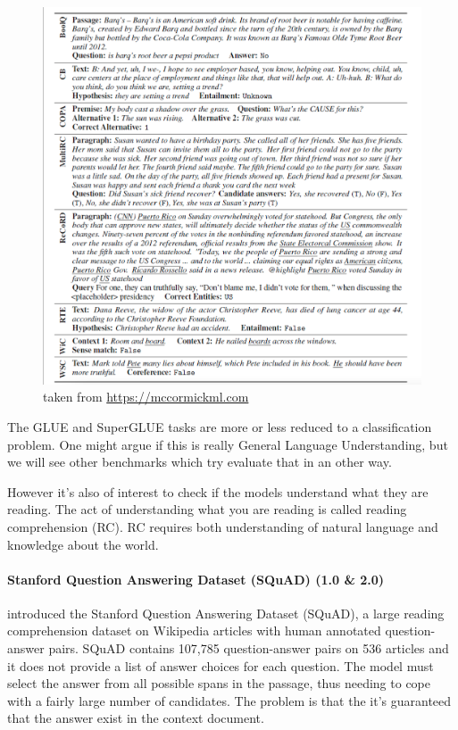 \documentclass[
]{krantz}
\begin{document}
\begin{figure}
\centering
\includegraphics{figures/01-chapter1/SuperGLUE.png}
\caption{taken from \url{https://mccormickml.com}}
\end{figure}

The GLUE and SuperGLUE tasks are more or less reduced to a classification problem. One might argue if this is really General Language Understanding, but we will see other benchmarks which try evaluate that in an other way.

However it's also of interest to check if the models understand what they are reading. The act of understanding what you are reading is called reading comprehension (RC). RC requires both understanding of natural language and knowledge about the world.

\hypertarget{stanford-question-answering-dataset-squad-1.0-2.0}{%
\paragraph{Stanford Question Answering Dataset (SQuAD) (1.0 \& 2.0)}\label{stanford-question-answering-dataset-squad-1.0-2.0}}

\citet{rajpurkar2016squad} introduced the Stanford Question Answering Dataset (SQuAD), a large reading comprehension dataset on Wikipedia articles with human annotated question-answer pairs. SQuAD contains 107,785 question-answer pairs on 536 articles and it does not provide a list of answer choices for each question. The model must select the answer from all possible spans in the passage, thus needing to cope with a fairly large number of candidates. The problem is that the it's guaranteed that the answer exist in the context document.
\end{document}

